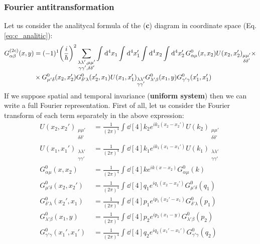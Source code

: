 \documentclass[11pt, a4paper, twoside, openright]{article}
\begin{document}
\subsubsection*{Fourier antitransformation}
Let us consider the analitycal formula of the (\textbf{c}) diagram in coordinate space (Eq.\eqref{eq:c_analitic}):
\begin{equation*}
\begin{split}
  G_{\alpha \beta }^{(2c)} (x,y) &= (-1)^1 \qty(\frac{i}{\hbar })^2
   \sum_{\substack{\lambda \lambda', \mu \mu' \\ \gamma \gamma', \delta \delta'   } }^{} \int_{}^{} \dd[4]{x_1} \int_{}^{} \dd[4]{x_1'} \int_{}^{} \dd[4]{x_2} \int_{}^{} \dd[4]{x_2'}
  G_{\alpha \mu }^0 (x,x_2) U(x_2,x_2')_{\substack{ \mu \mu' \\ \delta \delta'} } \times \\
  & \times G^0_{\mu' \delta } (x_2,x_2') G^0_{\delta' \lambda } (x_2',x_1)
   U(x_1,x_1')_{\substack{ \lambda \lambda' \\ \gamma \gamma'} }
  G^0_{\lambda' \beta } (x_1,y) G^0_{\gamma' \gamma } (x_1',x_1')
\end{split}
\end{equation*}
If we suppose spatial and temporal invariance (\textbf{uniform system}) then we can write a full Fourier representation.
First of all, let us consider the Fourier transform of each term separately in the above expression:
\begin{subequations}
\begin{align*}
  U (x_2,x_2')_{\substack{ \mu \mu' \\ \delta \delta'} } &=  \frac{1}{(2 \pi )^4} \int_{}^{} \dd[4]{k_2} e^{i k_2 (x_2-x_2')} U (k_2)_{\substack{ \mu \mu' \\ \delta \delta'} } \\
  U (x_1,x_1')_{\substack{ \lambda \lambda' \\ \gamma \gamma'} } &=  \frac{1}{(2 \pi )^4} \int_{}^{} \dd[4]{k_1} e^{i k_1 (x_1-x_1')} U (k_1)_{\substack{ \lambda \lambda' \\ \gamma \gamma'} } \\
  G^0_{\alpha \mu } (x,x_2)&=  \frac{1}{(2 \pi )^4} \int_{}^{} \dd[4]{k} e^{i k (x-x_2)}   G^0_{\alpha \mu } (k) \\
  G^0_{\mu' \delta } (x_2,x_2') &=  \frac{1}{(2 \pi )^4} \int_{}^{} \dd[4]{q_1} e^{i q_1 (x_2-x_2')}   G^0_{\mu' \delta } (q_1) \\
  G^0_{\delta' \lambda } (x_2',x_1) &=  \frac{1}{(2 \pi )^4} \int_{}^{} \dd[4]{p_1} e^{i p_1 (x_2'-x_1)}   G^0_{\delta' \lambda  } (p_1) \\
  G^0_{\lambda' \beta } (x_1,y) &=  \frac{1}{(2 \pi )^4} \int_{}^{} \dd[4]{p_2} e^{i p_2 (x_1-y)}   G^0_{\lambda' \beta  } (p_2) \\
  G^0_{\gamma' \gamma } (x_1',x_1') &=  \frac{1}{(2 \pi )^4} \int_{}^{} \dd[4]{q_2} e^{i q_2 (x_1'-x_1')}   G^0_{\gamma' \gamma  } (q_2)
\end{align*}
\end{subequations}
\end{document}
